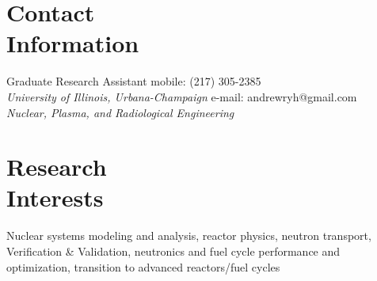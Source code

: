 \documentclass[margin,line]{resume}
\begin{document}
\begin{resume}

    \section{\mysidestyle Contact\\Information}

    Graduate Research Assistant \hfill mobile: (217) 305-2385 \vspace{0mm}\\\vspace{0mm}
    \hspace{-1.35mm}\textsl{University of Illinois, Urbana-Champaign}
        \hfill e-mail: andrewryh@gmail.com            \vspace{0mm}\\\vspace{0mm}%
    \textsl{Nuclear, Plasma, and Radiological Engineering}
       
    \section{\mysidestyle Research\\Interests}
		Nuclear systems modeling and analysis, reactor physics, neutron 
		transport, Verification \& Validation, neutronics and fuel cycle 
		performance and optimization, transition to advanced reactors/fuel 
		cycles

\end{resume}
\end{document}
